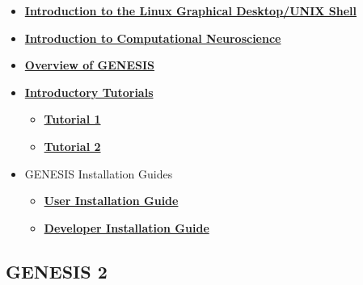 \documentclass[12pt]{article}
\begin{document}
\begin{itemize}

   \item \href{../unix-linux/unix-linux.tex}{\bf Introduction to the Linux Graphical Desktop/UNIX Shell}

   \item \href{../compneurosci-1/compneurosci-1.tex}{\bf Introduction to Computational Neuroscience}

   \item \href{../genesis-overview/genesis-overview.tex}{\bf Overview of GENESIS}

   \item \href{../contents-level1/contents-level1.tex}{\bf Introductory Tutorials}
     \begin{itemize}
        \item \href{../tutorial1/tutorial1.tex}{\bf Tutorial 1}
       \item \href{../tutorial2/tutorial2.tex}{\bf Tutorial 2}
     \end{itemize}

   \item GENESIS Installation Guides
      \begin{itemize}
         \item \href{../installation-debian/installation-debian.tex}{\bf User Installation Guide}
         \item \href{../developer-installation/developer-installation.tex}{\bf Developer Installation Guide}
      \end{itemize}

\end{itemize}

\subsection*{GENESIS 2}
\end{document}
